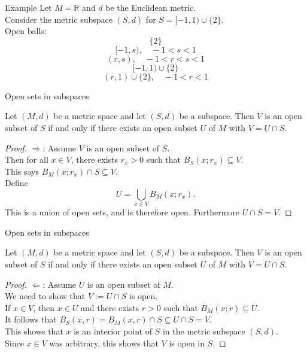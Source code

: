 \documentclass{beamer}
\begin{document}
\begin{frame}{Example}
Let $M=\mathbb{R}$ and $d$ be the Euclidean metric.\\
\pause
Consider the metric subspace $(S,d)$ for $S = [-1,1)\cup \{2\}$.\\
\pause
Open balls:
\pause
$$\{2\}$$
\pause
$$[-1,s),\quad -1 < s < 1$$
\pause
$$(r,s),\quad -1 < r < s < 1$$
\pause
$$[-1,1)\cup\{2\}$$
\pause
$$(r,1)\cup\{2\},\quad -1 < r <  1$$
\end{frame}

\begin{frame}{Open sets in subspaces}
\begin{thm}
Let $(M,d)$ be a metric space and let $(S,d)$ be a subspace.
Then $V$ is an open subset of $S$ if and only if there exists an open subset $U$ of $M$ with $V = U\cap S$.
\end{thm}
\pause
\begin{proof}
\pause
$\Longrightarrow$: Assume $V$ is an open subset of $S$.\\
\pause
Then for all $x\in V$, there exists $r_x>0$ such that $B_S(x;r_x) \subseteq V$.\\
\pause
This says $B_M(x; r_x)\cap S\subseteq V$.\\
\pause
Define
$$U = \bigcup_{x\in V} B_M(x;r_x).$$
\pause
This is a union of open sets, and is therefore open.
\pause
Furthermore $U\cap S = V$.
\end{proof}
\end{frame}

\begin{frame}{Open sets in subspaces}
\begin{thm}
Let $(M,d)$ be a metric space and let $(S,d)$ be a subspace.
Then $V$ is an open subset of $S$ if and only if there exists an open subset $U$ of $M$ with $V = U\cap S$.
\end{thm}
\pause
\begin{proof}
\pause
$\Longleftarrow$: Assume $U$ is an open subset of $M$.\\
\pause
We need to show that $V:= U\cap S$ is open.\\
\pause
If $x\in V$, then $x\in U$ and there exists $r>0$ such that $B_M(x;r)\subseteq U$.\\
\pause
It follows that $B_S(x,r) = B_M(x,r)\cap S\subseteq U\cap S = V$.\\
\pause
This shows that $x$ is an interior point of $S$ in the metric subspace $(S,d)$.\\
\pause
Since $x\in V$ was arbitrary, this shows that $V$ is open in $S$.
\end{proof}
\end{frame}
\end{document}
